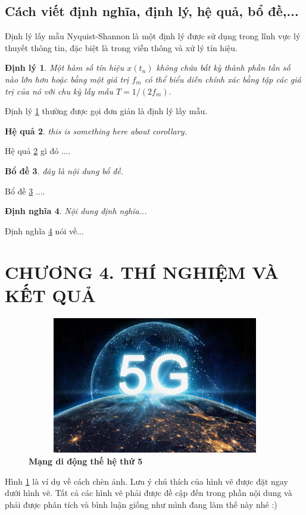 \documentclass{article} %
\newtheorem{theorem}{Định lý}[section]
\newtheorem{defn}[theorem]{Định nghĩa}
\newtheorem{corollary}[theorem]{Hệ quả}
\newtheorem{lemma}[theorem]{Bổ đề}
\begin{document}
\subsection{Cách viết định nghĩa, định lý, hệ quả, bổ đề,...}
Định lý lấy mẫu Nyquist-Shannon là một định lý được sử dụng trong lĩnh vực lý thuyết thông tin, đặc biệt là trong viễn thông và xử lý tín hiệu.
\begin{theorem}\label{đlNq} %
Một hàm số tín hiệu $x(t_n)$ không chứa bất kỳ thành phần tần số nào lớn hơn hoặc bằng một giá trị $f_m$ có thể biểu diễn chính xác bằng tập các giá trị của nó với chu kỳ lấy mẫu $T=1/(2f_m)$.
\end{theorem}
Định lý \ref{đlNq} thường được gọi đơn giản là định lý lấy mẫu.
\begin{corollary}\label{coro1}
this is something here about corollary.
\end{corollary}
Hệ quả \ref{coro1} gì đó ....
\begin{lemma}\label{lemma1}
đây là nội dung bổ đề.
\end{lemma}
Bổ đề \ref{lemma1} ....
\begin{defn}\label{defn1}
Nội dung định nghĩa...
\end{defn}
Định nghĩa \ref{defn1} nói về...
\newpage
\section*{CHƯƠNG 4. THÍ NGHIỆM VÀ KẾT QUẢ}
\setcounter{section}{4}
\setcounter{figure}{0}
\setcounter{table}{0}
\lipsum
\begin{figure}[!ht]
    \centering
    \includegraphics[width=16cm,height=6cm]{Images/5g.jpg}
    \caption[Mạng 5G]{\bfseries \fontsize{12pt}{0pt}\selectfont Mạng di động thế hệ thứ 5}
    \label{hinh41}
\end{figure}

Hình \ref{hinh41} là ví dụ về cách chèn ảnh. Lưu ý chú thích của hình vẽ được đặt ngay dưới hình vẽ. Tất cả các hình vẽ phải được đề cập đến trong phần nội dung và phải được phân tích và bình luận giống như mình đang làm thế này nhé :)
\newpage
\end{document}
